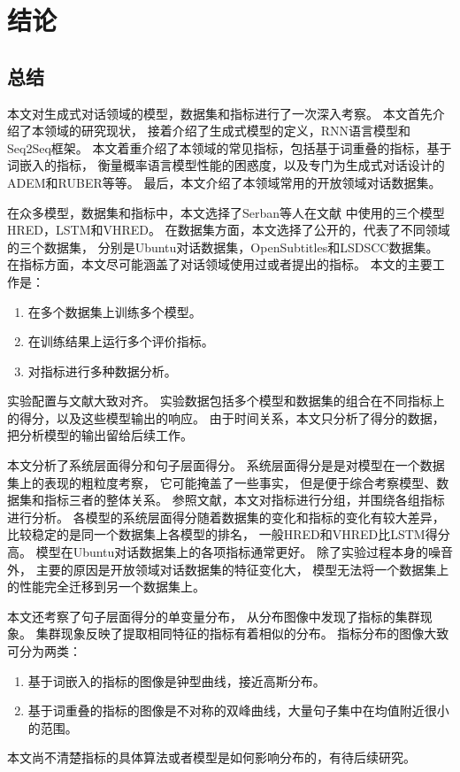 \chapter*{结论}\label{ch:conclusion}

\section*{总结}\label{sec:conclusion}
本文对生成式对话领域的模型，数据集和指标进行了一次深入考察。
本文首先介绍了本领域的研究现状，
接着介绍了生成式模型的定义，RNN语言模型和Seq2Seq框架。
本文着重介绍了本领域的常见指标，包括基于词重叠的指标，基于词嵌入的指标，
衡量概率语言模型性能的困惑度，以及专门为生成式对话设计的ADEM和RUBER等等。
最后，本文介绍了本领域常用的开放领域对话数据集。

在众多模型，数据集和指标中，本文选择了Serban等人在文献\cite{VHRED}
中使用的三个模型HRED，LSTM和VHRED。
在数据集方面，本文选择了公开的，代表了不同领域的三个数据集，
分别是Ubuntu对话数据集，OpenSubtitles和LSDSCC数据集。
在指标方面，本文尽可能涵盖了对话领域使用过或者提出的指标。
本文的主要工作是：
\begin{enumerate}
    \item 在多个数据集上训练多个模型。
    \item 在训练结果上运行多个评价指标。
    \item 对指标进行多种数据分析。
\end{enumerate}
实验配置与文献\cite{HowNot}大致对齐。
实验数据包括多个模型和数据集的组合在不同指标上的得分，以及这些模型输出的响应。
由于时间关系，本文只分析了得分的数据，把分析模型的输出留给后续工作。

本文分析了系统层面得分和句子层面得分。
系统层面得分是是对模型在一个数据集上的表现的粗粒度考察，
它可能掩盖了一些事实，
但是便于综合考察模型、数据集和指标三者的整体关系。
参照文献\cite{HowNot}，本文对指标进行分组，并围绕各组指标进行分析。
各模型的系统层面得分随着数据集的变化和指标的变化有较大差异，
比较稳定的是同一个数据集上各模型的排名，
一般HRED和VHRED比LSTM得分高。
模型在Ubuntu对话数据集上的各项指标通常更好。
除了实验过程本身的噪音外，
主要的原因是开放领域对话数据集的特征变化大，
模型无法将一个数据集上的性能完全迁移到另一个数据集上。

本文还考察了句子层面得分的单变量分布，
从分布图像中发现了指标的集群现象。
集群现象反映了提取相同特征的指标有着相似的分布。
指标分布的图像大致可分为两类：
\begin{enumerate}
    \item 基于词嵌入的指标的图像是钟型曲线，接近高斯分布。
    \item 基于词重叠的指标的图像是不对称的双峰曲线，大量句子集中在均值附近很小的范围。
\end{enumerate}
本文尚不清楚指标的具体算法或者模型是如何影响分布的，有待后续研究。

